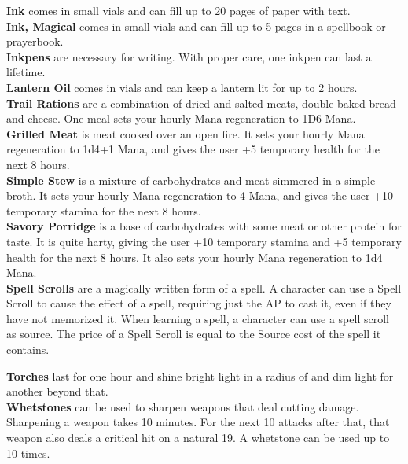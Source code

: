 \textbf{Ink} comes in small vials and can fill up to 20 pages of paper with text.\\

\textbf{Ink, Magical} comes in small vials and can fill up to 5 pages in a spellbook or prayerbook.\\

\textbf{Inkpens} are necessary for writing.
With proper care, one inkpen can last a lifetime.\\

\textbf{Lantern Oil} comes in vials and can keep a lantern lit for up to 2 hours.\\

\textbf{Trail Rations} are a combination of dried and salted meats, double-baked bread and cheese.
One meal sets your hourly Mana regeneration to 1D6 Mana.\\

\textbf{Grilled Meat} is meat cooked over an open fire.
It sets your hourly Mana regeneration to 1d4+1 Mana, and gives the user +5 temporary health for the next 8 hours.\\

\textbf{Simple Stew} is a mixture of carbohydrates and meat simmered in a simple broth.
It sets your hourly Mana regeneration to 4 Mana, and gives the user +10 temporary stamina for the next 8 hours.\\

\textbf{Savory Porridge} is a base of carbohydrates with some meat or other protein for taste.
It is quite harty, giving the user +10 temporary stamina and +5 temporary health for the next 8 hours.
It also sets your hourly Mana regeneration to 1d4 Mana.\\

\textbf{Spell Scrolls} are a magically written form of a spell.
A character can use a Spell Scroll to cause the effect of a spell, requiring just the AP to cast it, even if they have not memorized it.
When learning a spell, a character can use a spell scroll as source.
The price of a Spell Scroll is equal to the Source cost of the spell it contains.

\textbf{Torches} last for one hour and shine bright light in a radius of  and dim light for another  beyond that.\\

\textbf{Whetstones} can be used to sharpen weapons that deal cutting damage.
Sharpening a weapon takes 10 minutes.
For the next 10 attacks after that, that weapon also deals a critical hit on a natural 19.
A whetstone can be used up to 10 times.\\